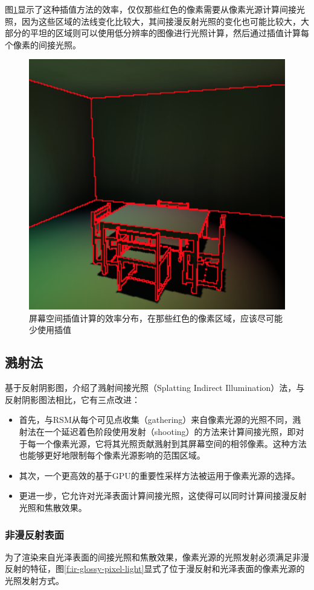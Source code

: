 图\ref{f:ir-rsm-ss-interpolation}显示了这种插值方法的效率，仅仅那些红色的像素需要从像素光源计算间接光照，因为这些区域的法线变化比较大，其间接漫反射光照的变化也可能比较大，大部分的平坦的区域则可以使用低分辨率的图像进行光照计算，然后通过插值计算每个像素的间接光照。

\begin{figure}
\sidecaption
	\includegraphics[width=.42\textwidth]{figures/ir/ir-2-4}
	\caption{屏幕空间插值计算的效率分布，在那些红色的像素区域，应该尽可能少使用插值}
	\label{f:ir-rsm-ss-interpolation}
\end{figure} 




\subsection{溅射法}\label{sec:ir-splatting}
基于反射阴影图，\cite{a:SplattingIndirectIllumination}介绍了溅射间接光照（Splatting Indirect Illumination）法，与反射阴影图法相比，它有三点改进：

\begin{itemize}
	\item 首先，与RSM从每个可见点收集（gathering）来自像素光源的光照不同，溅射法在一个延迟着色阶段使用发射（shooting）的方法来计算间接光照，即对于每一个像素光源，它将其光照贡献溅射到其屏幕空间的相邻像素。这种方法也能够更好地限制每个像素光源影响的范围区域。
	\item 其次，一个更高效的基于GPU的重要性采样方法被运用于像素光源的选择。
	\item 更进一步，它允许对光泽表面计算间接光照，这使得可以同时计算间接漫反射光照和焦散效果。
\end{itemize}




\subsubsection{非漫反射表面}
为了渲染来自光泽表面的间接光照和焦散效果，像素光源的光照发射必须满足非漫反射的特征，图\ref{f:ir-glossy-pixel-light}显式了位于漫反射和光泽表面的像素光源的光照发射方式。

